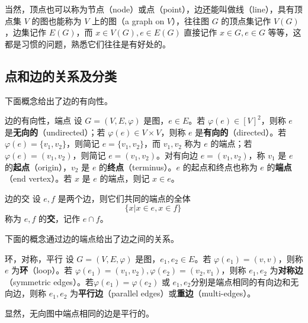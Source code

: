 当然，顶点也可以称为节点（node）或点（point），边还能叫做线（line），具有顶点集 $V$ 的图也能称为 $V$ 上的图（a graph on $V$），往往图 $G$ 的顶点集记作 $V(G)$，边集记作 $E(G)$，而 $x\in V(G),e\in E(G)$ 直接记作 $x\in G,e\in G$ 等等，这都是习惯的问题，熟悉它们往往是有好处的。

\subsection{点和边的关系及分类}


下面概念给出了边的有向性。
\begin{definition}{边的有向性，端点}
设 $G=(V,E,\varphi)$ 是图，$e\in E$。若 $\varphi(e)\in[V]^2$，则称 $e$ 是\textbf{无向的}（undirected）；若 $\varphi(e)\in V\times V$，则称 $e$ 是\textbf{有向的}（directed）。若 $\varphi(e)=\{v_1,v_2\}$，则简记 $e=\{v_1,v_2\}$，而 $v_1,v_2$ 称为 $e$ 的端点；若 $\varphi(e)=(v_1,v_2)$，则简记 $e=(v_1,v_2)$。对有向边 $e=(v_1,v_2)$，称 $v_1$ 是 $e$ 的\textbf{起点}（origin），$v_2$ 是 $e$ 的\textbf{终点}（terminus）。$e$ 的起点和终点也称为 $e$ 的\textbf{端点}（end vertex）。若 $x$ 是 $e$ 的端点，则记 $x\in e$。
\end{definition}

\begin{definition}{边的交}
设 $e,f$ 是两个边，则它们共同的端点的全体
\begin{equation}
\{x|x\in e,x\in f\}~
\end{equation}
称为 $e,f$ 的\textbf{交}，记作 $e\cap f$。
\end{definition}

下面的概念通过边的端点给出了边之间的关系。
\begin{definition}{环，对称，平行}
设 $G=(V,E,\varphi)$ 是图，$e_1,e_2\in E$。若 $\varphi(e_1)=(v,v)$，则称 $e$ 为\textbf{环}（loop）。若 $\varphi(e_1)=(v_1,v_2),\varphi(e_2)=(v_2,v_1)$，则称 $e_1,e_2$ 为\textbf{对称边}（symmetric edges）。若$\varphi(e_1)=\varphi(e_2)$ 或 $e_1,e_2$分别是端点相同的有向边和无向边，则称 $e_1,e_2$ 为\textbf{平行边}（parallel edges）或\textbf{重边}（multi-edges）。
\end{definition}
显然，无向图中端点相同的边是平行的。

